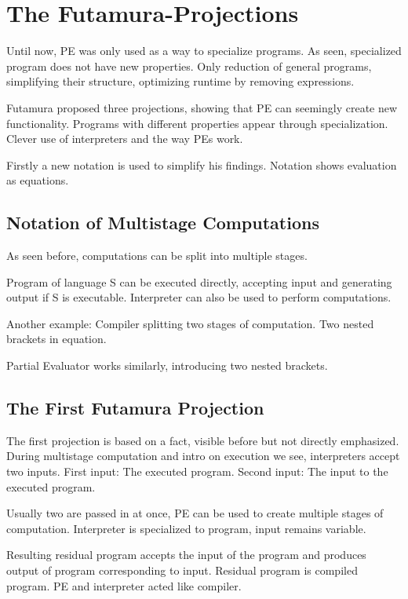 
\section{The Futamura-Projections}\label{sec:futamura}

Until now, PE was only used as a way to specialize programs.
As seen, specialized program does not have new properties.
Only reduction of general programs, simplifying their structure, optimizing runtime by removing expressions.

Futamura proposed three projections, showing that PE can seemingly create new functionality.
Programs with different properties appear through specialization.
Clever use of interpreters and the way PEs work.

Firstly a new notation is used to simplify his findings.
Notation shows evaluation as equations.

\subsection{Notation of Multistage Computations}\label{sec:multistage-notation}

As seen before, computations can be split into multiple stages.

Program of language S can be executed directly, accepting input and generating output if S is executable.
Interpreter can also be used to perform computations.

Another example: Compiler splitting two stages of computation.
Two nested brackets in equation.

Partial Evaluator works similarly, introducing two nested brackets.


\subsection{The First Futamura Projection}\label{sec:futamura-first}

The first projection is based on a fact, visible before but not directly emphasized.
During multistage computation and intro on execution we see, interpreters accept two inputs.
First input: The executed program.
Second input: The input to the executed program.

Usually two are passed in at once, PE can be used to create multiple stages of computation.
Interpreter is specialized to program, input remains variable.

Resulting residual program accepts the input of the program and produces output of program corresponding to input.
Residual program is compiled program.
PE and interpreter acted like compiler.


